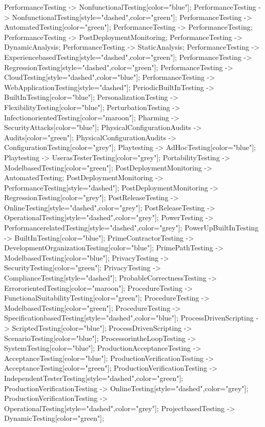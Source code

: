 \documentclass{article}
\begin{document}
{PerformanceTesting -> NonfunctionalTesting[color="blue"];
PerformanceTesting -> NonfunctionalTesting[style="dashed",color="green"];
PerformanceTesting -> AutomatedTesting[color="green"];
PerformanceTesting -> PerformanceTesting;
PerformanceTesting -> PostDeploymentMonitoring;
PerformanceTesting -> DynamicAnalysis;
PerformanceTesting -> StaticAnalysis;
PerformanceTesting -> ExperiencebasedTesting[style="dashed",color="green"];
PerformanceTesting -> RegressionTesting[style="dashed",color="green"];
PerformanceTesting -> CloudTesting[style="dashed",color="blue"];
PerformanceTesting -> WebApplicationTesting[style="dashed"];
PeriodicBuiltInTesting -> BuiltInTesting[color="blue"];
PersonalizationTesting -> FlexibilityTesting[color="blue"];
PerturbationTesting -> InfectionorientedTesting[color="maroon"];
Pharming -> SecurityAttacks[color="blue"];
PhysicalConfigurationAudits -> Audits[color="green"];
PhysicalConfigurationAudits -> ConfigurationTesting[color="grey"];
Playtesting -> AdHocTesting[color="blue"];
Playtesting -> UserasTesterTesting[color="grey"];
PortabilityTesting -> ModelbasedTesting[color="green"];
PostDeploymentMonitoring -> AutomatedTesting;
PostDeploymentMonitoring -> PerformanceTesting[style="dashed"];
PostDeploymentMonitoring -> RegressionTesting[color="grey"];
PostReleaseTesting -> OnlineTesting[style="dashed",color="grey"];
PostReleaseTesting -> OperationalTesting[style="dashed",color="grey"];
PowerTesting -> PerformancerelatedTesting[style="dashed",color="grey"];
PowerUpBuiltInTesting -> BuiltInTesting[color="blue"];
PrimeContractorTesting -> DevelopmentOrganizationTesting[color="blue"];
PrimePathTesting -> ModelbasedTesting[color="blue"];
PrivacyTesting -> SecurityTesting[color="green"];
PrivacyTesting -> ComplianceTesting[style="dashed"];
ProbableCorrectnessTesting -> ErrororientedTesting[color="maroon"];
ProcedureTesting -> FunctionalSuitabilityTesting[color="green"];
ProcedureTesting -> ModelbasedTesting[color="green"];
ProcedureTesting -> SpecificationbasedTesting[style="dashed",color="blue"];
ProcessDrivenScripting -> ScriptedTesting[color="blue"];
ProcessDrivenScripting -> ScenarioTesting[color="blue"];
ProcessorintheLoopTesting -> SystemTesting[color="blue"];
ProductionAcceptanceTesting -> AcceptanceTesting[color="blue"];
ProductionVerificationTesting -> AcceptanceTesting[color="green"];
ProductionVerificationTesting -> IndependentTesterTesting[style="dashed",color="green"];
ProductionVerificationTesting -> OnlineTesting[style="dashed",color="grey"];
ProductionVerificationTesting -> OperationalTesting[style="dashed",color="grey"];
ProjectbasedTesting -> DynamicTesting[color="green"];
}
\end{document}
